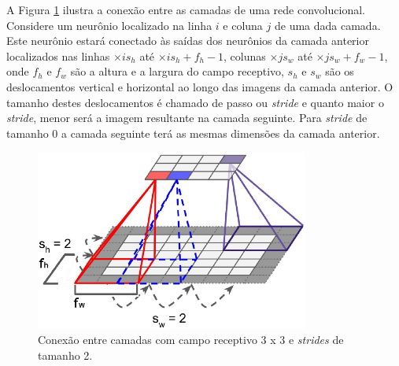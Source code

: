 A Figura \ref{fig:cnn_stride} ilustra a conexão entre as camadas de uma rede convolucional.
Considere um neurônio localizado na linha $i$ e coluna $j$ de uma dada camada.
Este neurônio estará conectado às saídas dos neurônios da camada anterior
localizados nas linhas $\times{i}{s_h}$ até $\times{i}{s_h}+f_h - 1$, colunas
$\times{j}{s_w}$ até $\times{j}{s_w}+f_w - 1$, onde
$f_h$ e $f_w$ são a altura e a largura do campo receptivo, $s_h$ e $s_w$
são os deslocamentos vertical e horizontal ao longo das imagens da camada anterior.
O tamanho destes deslocamentos é chamado de passo ou \textit{stride}
e quanto maior o \textit{stride}, menor será a imagem resultante na camada seguinte. Para \textit{stride}
de tamanho $0$ a camada seguinte terá as mesmas dimensões da camada anterior.
\begin{figure}[htp]
\begin{center}
  \includegraphics[width=0.8\textwidth]{fig/cnn_layer_stride_2}
  \caption{Conexão entre camadas com campo receptivo 3 x 3 e \textit{strides} de tamanho 2.}
  \label{fig:cnn_stride}
\end{center}
\end{figure}

